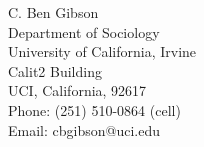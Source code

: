 \documentclass[10pt,stdletter,dateno,sigleft]{newlfm} %
\begin{document}
\begin{newlfm}
\setlength\parindent{24pt}
\indent C. Ben Gibson \\ 
\indent Department of Sociology \\ 
\indent University of California, Irvine \\
 Calit2 Building\\
\indent UCI, California, 92617\\
\indent Phone: (251) 510-0864 (cell)\\
\indent Email: cbgibson@uci.edu\\


\end{newlfm}
\end{document}
